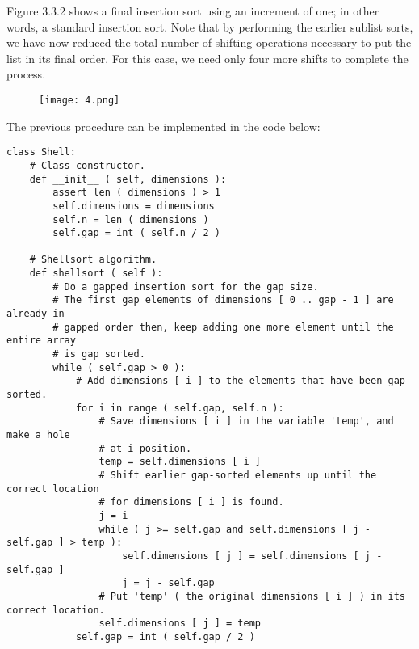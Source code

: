 Figure 3.3.2 shows a final insertion sort using an increment of one; in other words, a standard insertion sort. Note that by performing the earlier sublist sorts, we have now reduced the total number of shifting operations necessary to put the list in its final order. For this case, we need only four more shifts to complete the process. \hfill \break

\begin{figure}[H]
\texttt{[image: 4.png]}
\centering \linebreak {}
\end{figure} 

The previous procedure can be implemented in the code below: \hfill \break

\begin{lstlisting}
class Shell:
    # Class constructor.
    def __init__ ( self, dimensions ):
        assert len ( dimensions ) > 1
        self.dimensions = dimensions
        self.n = len ( dimensions )
        self.gap = int ( self.n / 2 )

    # Shellsort algorithm.
    def shellsort ( self ):
        # Do a gapped insertion sort for the gap size.
        # The first gap elements of dimensions [ 0 .. gap - 1 ] are already in
        # gapped order then, keep adding one more element until the entire array
        # is gap sorted.
        while ( self.gap > 0 ):
            # Add dimensions [ i ] to the elements that have been gap sorted.
            for i in range ( self.gap, self.n ):
                # Save dimensions [ i ] in the variable 'temp', and make a hole
                # at i position.
                temp = self.dimensions [ i ]
                # Shift earlier gap-sorted elements up until the correct location
                # for dimensions [ i ] is found.
                j = i
                while ( j >= self.gap and self.dimensions [ j - self.gap ] > temp ):
                    self.dimensions [ j ] = self.dimensions [ j - self.gap ]
                    j = j - self.gap
                # Put 'temp' ( the original dimensions [ i ] ) in its correct location.
                self.dimensions [ j ] = temp
            self.gap = int ( self.gap / 2 )
\end{lstlisting}

\pagebreak